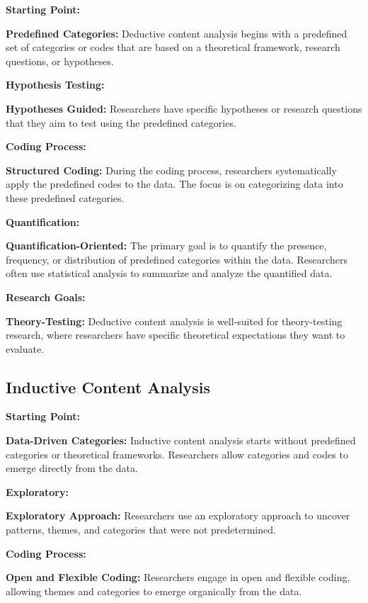 \documentclass[
  b5paper]{book}
\begin{document}
\textbf{Starting Point:}

\textbf{Predefined Categories:} Deductive content analysis begins with a predefined set of categories or codes that are based on a theoretical framework, research questions, or hypotheses.

\textbf{Hypothesis Testing:}

\textbf{Hypotheses Guided:} Researchers have specific hypotheses or research questions that they aim to test using the predefined categories.

\textbf{Coding Process:}

\textbf{Structured Coding:} During the coding process, researchers systematically apply the predefined codes to the data. The focus is on categorizing data into these predefined categories.

\textbf{Quantification:}

\textbf{Quantification-Oriented:} The primary goal is to quantify the presence, frequency, or distribution of predefined categories within the data. Researchers often use statistical analysis to summarize and analyze the quantified data.

\textbf{Research Goals:}

\textbf{Theory-Testing:} Deductive content analysis is well-suited for theory-testing research, where researchers have specific theoretical expectations they want to evaluate.

\hypertarget{inductive-content-analysis}{%
\subsection*{Inductive Content Analysis}\label{inductive-content-analysis}}

\textbf{Starting Point:}

\textbf{Data-Driven Categories:} Inductive content analysis starts without predefined categories or theoretical frameworks. Researchers allow categories and codes to emerge directly from the data.

\textbf{Exploratory:}

\textbf{Exploratory Approach:} Researchers use an exploratory approach to uncover patterns, themes, and categories that were not predetermined.

\textbf{Coding Process:}

\textbf{Open and Flexible Coding:} Researchers engage in open and flexible coding, allowing themes and categories to emerge organically from the data.
\end{document}
